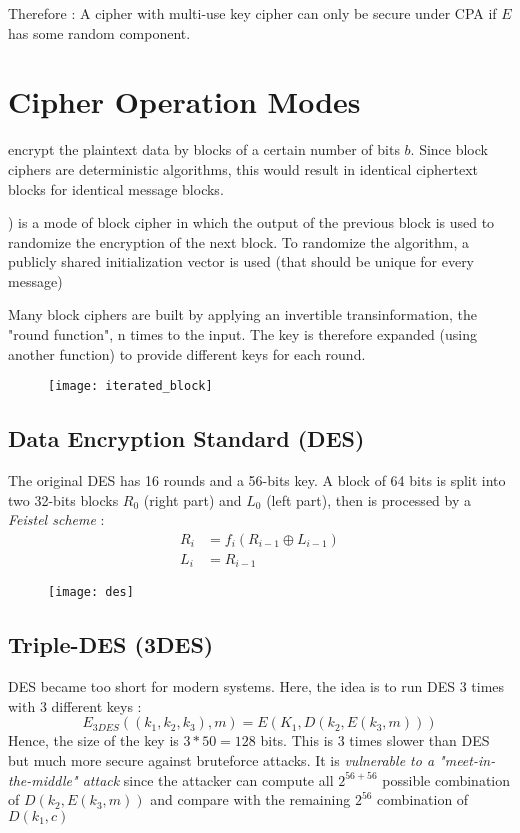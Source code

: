 Therefore : A cipher with multi-use key cipher can only be secure under CPA if $E$ has some random component.

\section{Cipher Operation Modes}

 encrypt the plaintext data by blocks of a certain number of bits $b$. Since block ciphers are deterministic algorithms, this would result in identical ciphertext blocks for identical message blocks.

 ) is a mode of block cipher in which the output of the previous block is used to randomize the encryption of the next block. To randomize the algorithm, a publicly shared initialization vector is used (that should be unique for every message)

Many block ciphers are built by applying an invertible transinformation, the "round function", n times to the input. The key is therefore expanded (using another function) to provide different keys for each round.
\begin{figure}[H]
    \centering
    \texttt{[image: iterated\_block]}
\end{figure}

\subsection{Data Encryption Standard (DES)}

The original DES has 16 rounds and a 56-bits key. A block of 64 bits is split into two 32-bits blocks $R_0$ (right part) and $L_0$ (left part), then is processed by a \textit{Feistel scheme} :
\begin{align*}
R_i &= f_i(R_{i-1} \oplus L_{i-1})\\
L_i &= R_{i-1}
\end{align*}
\begin{figure}[H]
    \centering
    \texttt{[image: des]}
\end{figure}

\subsection{Triple-DES (3DES)}

DES became too short for modern systems. Here, the idea is to run DES 3 times with 3 different keys :
\[
E_{3DES}((k_1, k_2, k_3), m) = E(K_1, D(k_2, E(k_3, m)))
\]
Hence, the size of the key is $3*50 = 128$ bits. This is 3 times slower than DES but much more secure against bruteforce attacks. It is \textit{vulnerable to a "meet-in-the-middle" attack} since the attacker can compute all $2^{56+56}$ possible combination of $D(k_2, E(k_3, m))$ and compare with the remaining $2^{56}$ combination of $D(k_1, c)$

